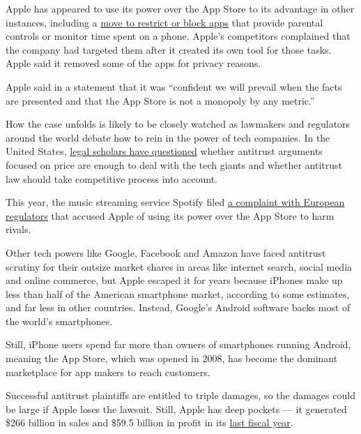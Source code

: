 Apple has appeared to use its power over the App Store to its advantage
in other instances, including a
\href{https://www.nytimes3xbfgragh.onion/2019/04/27/technology/apple-screen-time-trackers.html}{move
to restrict or block apps} that provide parental controls or monitor
time spent on a phone. Apple's competitors complained that the company
had targeted them after it created its own tool for those tasks. Apple
said it removed some of the apps for privacy reasons.

Apple said in a statement that it was ``confident we will prevail when
the facts are presented and that the App Store is not a monopoly by any
metric.''

How the case unfolds is likely to be closely watched as lawmakers and
regulators around the world debate how to rein in the power of tech
companies. In the United States,
\href{https://www.nytimes3xbfgragh.onion/2018/09/07/technology/monopoly-antitrust-lina-khan-amazon.html}{legal
scholars have questioned} whether antitrust arguments focused on price
are enough to deal with the tech giants and whether antitrust law should
take competitive process into account.

This year, the music streaming service Spotify filed
\href{https://www.nytimes3xbfgragh.onion/2019/03/13/business/spotify-apple-complaint.html?smid=nytcore-ios-share}{a
complaint with European regulators} that accused Apple of using its
power over the App Store to harm rivals.

Other tech powers like Google, Facebook and Amazon have faced antitrust
scrutiny for their outsize market shares in areas like internet search,
social media and online commerce, but Apple escaped it for years because
iPhones make up less than half of the American smartphone market,
according to some estimates, and far less in other countries. Instead,
Google's Android software backs most of the world's smartphones.

Still, iPhone users spend far more than owners of smartphones running
Android, meaning the App Store, which was opened in 2008, has become the
dominant marketplace for app makers to reach customers.

Successful antitrust plaintiffs are entitled to triple damages, so the
damages could be large if Apple loses the lawsuit. Still, Apple has deep
pockets --- it generated \$266 billion in sales and \$59.5 billion in
profit in its
\href{https://www.apple.com/newsroom/pdfs/Q4-FY18-Consolidated-Financial-Statements.pdf}{last
fiscal year}.

